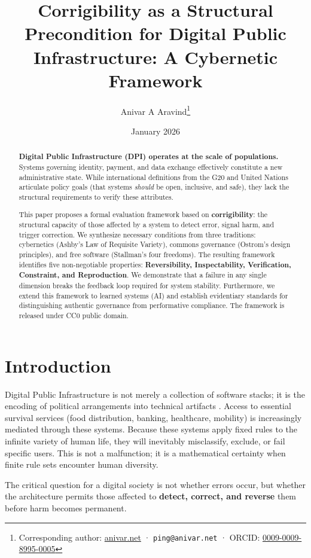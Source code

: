 \documentclass{article}
\title{Corrigibility as a Structural Precondition for Digital Public Infrastructure: A Cybernetic Framework}
\author[1]{Anivar A Aravind\thanks{Corresponding author: \href{https://anivar.net}{anivar.net} · \texttt{ping@anivar.net} · ORCID: \href{https://orcid.org/0009-0009-8995-0005}{0009-0009-8995-0005}}}
\affil[1]{Independent Researcher}
\date{January 2026}
\begin{document}
\maketitle

\begin{abstract}
\textbf{Digital Public Infrastructure (DPI) operates at the scale of populations.} Systems governing identity, payment, and data exchange effectively constitute a new administrative state. While international definitions from the G20 and United Nations articulate policy goals (that systems \textit{should} be open, inclusive, and safe), they lack the structural requirements to verify these attributes.

This paper proposes a formal evaluation framework based on \textbf{corrigibility}: the structural capacity of those affected by a system to detect error, signal harm, and trigger correction. We synthesize necessary conditions from three traditions: cybernetics (Ashby's Law of Requisite Variety), commons governance (Ostrom's design principles), and free software (Stallman's four freedoms). The resulting framework identifies five non-negotiable properties: \textbf{Reversibility, Inspectability, Verification, Constraint, and Reproduction}. We demonstrate that a failure in any single dimension breaks the feedback loop required for system stability. Furthermore, we extend this framework to learned systems (AI) and establish evidentiary standards for distinguishing authentic governance from performative compliance. The framework is released under CC0 public domain.
\end{abstract}

\section{Introduction}

Digital Public Infrastructure is not merely a collection of software stacks; it is the encoding of political arrangements into technical artifacts \citep{winner1980}. Access to essential survival services (food distribution, banking, healthcare, mobility) is increasingly mediated through these systems. Because these systems apply fixed rules to the infinite variety of human life, they will inevitably misclassify, exclude, or fail specific users. This is not a malfunction; it is a mathematical certainty when finite rule sets encounter human diversity.

The critical question for a digital society is not whether errors occur, but whether the architecture permits those affected to \textbf{detect, correct, and reverse} them before harm becomes permanent.
\end{document}
